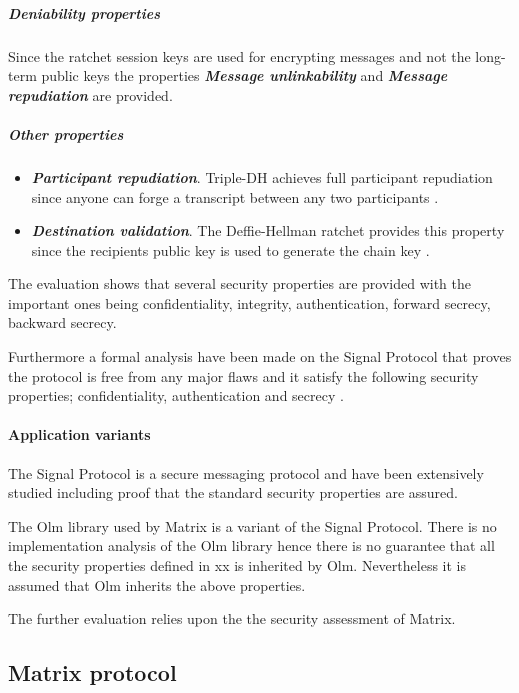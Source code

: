\subparagraph{Deniability properties}

Since the ratchet session keys are used for encrypting messages and not the long-term public keys the properties \textbf{\emph{Message unlinkability}} and \textbf{\emph{Message repudiation}} are provided. 


\subparagraph{Other properties}

\begin{itemize}
	\item \textbf{\emph{Participant repudiation}}. Triple-DH achieves full participant repudiation since anyone can forge a transcript between any two participants \cite{sok}.
	\item \textbf{\emph{Destination validation}}. The Deffie-Hellman ratchet provides this property since the recipients public key is used to generate the chain key \cite{sok}. %
\end{itemize}


The evaluation shows that several security properties are provided with the important ones being confidentiality, integrity, authentication, forward secrecy, backward secrecy. 

Furthermore a formal analysis have been made on the Signal Protocol that proves the protocol is free from any major flaws and it satisfy the following security properties; confidentiality, authentication and secrecy \cite{Signal}. 

\paragraph{Application variants}

The Signal Protocol is a secure messaging protocol and have been extensively studied including proof that the standard security properties are assured. 

The Olm library used by Matrix is a variant of the Signal Protocol. There is no implementation analysis of the Olm library hence there is no guarantee that all the security properties defined in xx is inherited by Olm. Nevertheless it is assumed that Olm inherits the above properties.

The further evaluation relies upon the the security assessment of Matrix. 


\subsection{Matrix protocol}\label{matrixeval}

